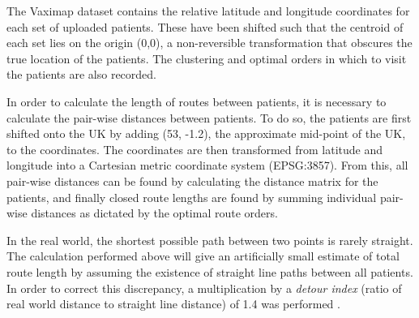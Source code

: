 \documentclass{article}
\def\vm{Vaximap}
\begin{document}
The \vm{} dataset contains the relative latitude and longitude coordinates for each set of uploaded patients. These have been shifted such that the centroid of each set lies on the origin (0,0), a non-reversible transformation that obscures the true location of the patients. The clustering and optimal orders in which to visit the patients are also recorded. 

In order to calculate the length of routes between patients, it is necessary to calculate the pair-wise distances between patients. To do so, the patients are first shifted onto the UK by adding (53, -1.2), the approximate mid-point of the UK, to the coordinates. The coordinates are then transformed from latitude and longitude into a Cartesian metric coordinate system (EPSG:3857). From this, all pair-wise distances can be found by calculating the distance matrix for the patients, and finally closed route lengths are found by summing individual pair-wise distances as dictated by the optimal route orders. 

In the real world, the shortest possible path between two points is rarely straight. The calculation performed above will give an artificially small estimate of total route length by assuming the existence of straight line paths between all patients. In order to correct this discrepancy, a multiplication by a \textit{detour index} (ratio of real world distance to straight line distance) of 1.4 was performed \cite{Cole1968}. 

\begingroup
\sloppy
\printbibliography
\endgroup
\end{document}
